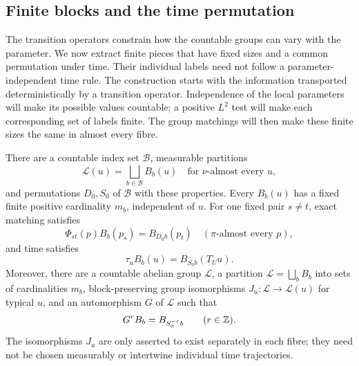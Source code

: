 \subsection{Finite blocks and the time permutation}

The transition operators constrain how the countable groups can vary
with the parameter. We now extract finite pieces that have fixed sizes
and a common permutation under time. Their individual labels need not
follow a parameter-independent time rule. The construction starts with
the information transported deterministically by a transition operator.
Independence of the local parameters will make its possible values
countable; a positive $L^2$ test will make each corresponding set of
labels finite. The group matchings will then make these finite sizes
the same in almost every fibre.

\begin{lemma}\label{lem:finite-blocks}
There are a countable index set $\mathcal B$, measurable partitions
\[
 \mathcal L(u)=\bigsqcup_{b\in\mathcal B}B_b(u)
 \quad\text{for }\nu\text{-almost every }u,
\]
and permutations $D_0,S_0$ of $\mathcal B$ with these properties.
Every $B_b(u)$ has a fixed finite positive cardinality $m_b$, independent
of $u$. For one fixed pair $s\ne t$, exact matching satisfies
\[
 \Phi_{st}(p)B_b(p_s)=B_{D_0b}(p_t)
 \quad(\pi\text{-almost every }p),
\]
and time satisfies
\[
 \tau_u B_b(u)=B_{S_0b}(T_Uu).
\]
Moreover, there are a countable abelian group $\mathcal L$, a
partition $\mathcal L=\bigsqcup_b B_b$ into sets of cardinalities $m_b$,
block-preserving group isomorphisms
$J_u:\mathcal L\to\mathcal L(u)$ for typical $u$, and an automorphism
$G$ of $\mathcal L$ such that
\begin{equation}\label{eq:abstract-block-time}
 G^r B_b=B_{S_0^{-r}b}\qquad(r\in\mathbb Z).
\end{equation}
The isomorphisms $J_u$ are only asserted to exist separately in each
fibre; they need not be chosen measurably or intertwine individual
time trajectories.
\end{lemma}

